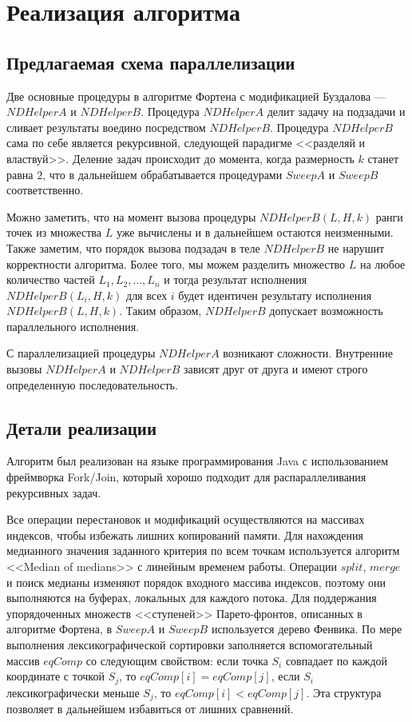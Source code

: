 \chapter{Реализация алгоритма}
\section{Предлагаемая схема параллелизации}
Две основные процедуры в алгоритме Фортена с модификацией Буздалова --- $NDHelperA$ и $NDHelperB$.
Процедура $NDHelperA$ делит задачу на подзадачи и сливает результаты воедино посредством $NDHelperB$.
Процедура $NDHelperB$ сама по себе является рекурсивной, следующей парадигме <<разделяй и властвуй>>.
Деление задач происходит до момента, когда размерность $k$ станет равна $2$, что в дальнейшем обрабатывается процедурами $SweepA$ и $SweepB$ соответственно.

Можно заметить, что на момент вызова процедуры $NDHelperB(L, H, k)$ ранги точек из множества $L$ уже вычислены и в дальнейшем остаются неизменными.
Также заметим, что порядок вызова подзадач в теле $NDHelperB$ не нарушит корректности алгоритма.
Более того, мы можем разделить множество $L$ на любое количество частей ${L_1, L_2,\ldots, L_n}$ и тогда результат исполнения $NDHelperB(L_i, H, k)$ для всех $i$ будет идентичен результату исполнения $NDHelperB(L, H, k)$.
Таким образом, $NDHelperB$ допускает возможность параллельного исполнения.

С параллелизацией процедуры $NDHelperA$ возникают сложности.
Внутренние вызовы $NDHelperA$ и $NDHelperB$ зависят друг от друга и имеют строго определенную последовательность. 

\section{Детали реализации}
Алгоритм был реализован на языке программирования Java с использованием фреймворка Fork/Join, который хорошо подходит для распараллеливания рекурсивных задач.

Все операции перестановок и модификаций осуществляются на массивах индексов, чтобы избежать лишних копирований памяти.
Для нахождения медианного значения заданного критерия по всем точкам используется алгоритм <<Median of medians>> с линейным временем работы.
Операции $split$, $merge$ и поиск медианы изменяют порядок входного массива индексов, поэтому они выполняются на буферах, локальных для каждого потока.
Для поддержания упорядоченных множеств <<ступеней>> Парето-фронтов, описанных в алгоритме Фортена, в $SweepA$ и $SweepB$ используется дерево Фенвика.
По мере выполнения лексикографической сортировки заполняется вспомогательный массив $eqComp$ со следующим свойством: если точка $S_i$ совпадает по каждой координате с точкой $S_j$, то $eqComp[i] = eqComp[j]$, если $S_i$ лексикографически меньше $S_j$, то $eqComp[i] < eqComp[j]$.
Эта структура позволяет в дальнейшем избавиться от лишних сравнений.

